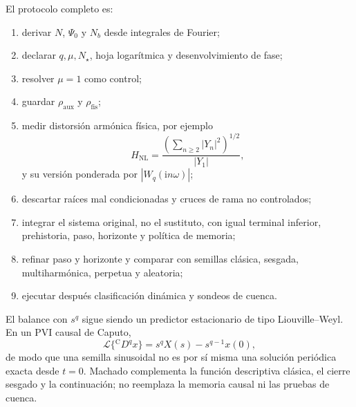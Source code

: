 El protocolo completo es:
\begin{enumerate}
 \item derivar \(N\), \(\Psi_0\) y \(N_b\) desde integrales de Fourier;
 \item declarar \(q,\mu,N_\star\), hoja logarítmica y desenvolvimiento de fase;
 \item resolver \(\mu=1\) como control;
 \item guardar \(\rho_{\mathrm{aux}}\) y \(\rho_{\mathrm{fis}}\);
 \item medir distorsión armónica física, por ejemplo
 \[
 H_{\mathrm{NL}}=
 \frac{(\sum_{n\ge2}|Y_n|^2)^{1/2}}{|Y_1|},
 \]
 y su versión ponderada por \(|W_q(\mathrm in\omega)|\);
 \item descartar raíces mal condicionadas y cruces de rama no controlados;
 \item integrar el sistema original, no el sustituto, con igual terminal
       inferior, prehistoria, paso, horizonte y política de memoria;
 \item refinar paso y horizonte y comparar con semillas clásica, sesgada,
       multiharmónica, perpetua y aleatoria;
 \item ejecutar después clasificación dinámica y sondeos de cuenca.
\end{enumerate}

El balance con \(s^q\) sigue siendo un predictor estacionario de tipo
Liouville--Weyl. En un PVI causal de Caputo,
\[
 \mathcal L\{{}^{\mathrm C}D^qx\}
 =s^qX(s)-s^{q-1}x(0),
\]
de modo que una semilla sinusoidal no es por sí misma una solución periódica
exacta desde \(t=0\). Machado complementa la función descriptiva clásica, el
cierre sesgado y la continuación; no reemplaza la memoria causal ni las
pruebas de cuenca.
